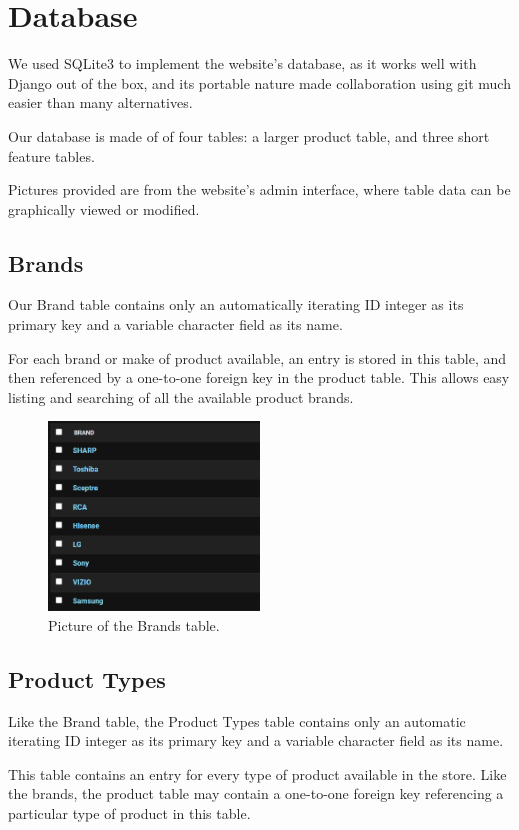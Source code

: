 \documentclass[sigconf]{acmart}
\begin{document}
\section{Database}
We used SQLite3 to implement the website's database, as it works well with Django out of the box, and its portable nature made collaboration using git much easier than many alternatives. \par
Our database is made of of four tables: a larger product table, and three short feature tables. \par
Pictures provided are from the website's admin interface, where table data can be graphically viewed or modified.

\subsection{Brands}
Our Brand table contains only an automatically iterating ID integer as its primary key and a variable character field as its name.\par
For each brand or make of product available, an entry is stored in this table, and then referenced by a one-to-one foreign key in the product table. This allows easy listing and searching of all the available product brands.

\begin{figure}[H] %
    \centering
	\includegraphics[width=0.5\textwidth]{Figures/brands.png} %
	\caption{Picture of the Brands table.}
\end{figure}

\subsection{Product Types}
Like the Brand table, the Product Types table contains only an automatic iterating ID integer as its primary key and a variable character field as its name. \par
This table contains an entry for every type of product available in the store. Like the brands, the product table may contain a one-to-one foreign key referencing a particular type of product in this table.
\end{document}
